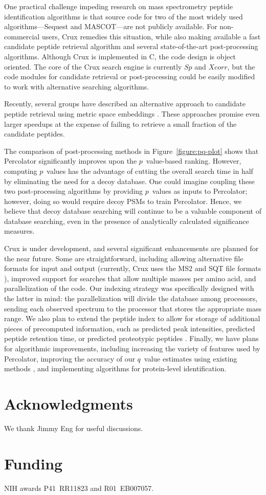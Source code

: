\documentclass[12pt]{article}
\begin{document}
One practical challenge impeding research on mass spectrometry peptide
identification algorithms is that source code for two of the most
widely used algorithms---{\sc Sequest} and MASCOT---are not publicly
available.  For non-commercial users, Crux remedies this situation,
while also making available a fast candidate peptide retrieval
algorithm and several state-of-the-art post-processing algorithms.
Although Crux is implemented in C, the code design is object oriented.
The core of the Crux search engine is currently $Sp$
and $Xcorr$, but the code modules for candidate retrieval or
post-processing could be easily modified to work with alternative
searching algorithms.

Recently, several groups have described an alternative
approach to candidate peptide retrieval using metric space embeddings
\cite{ramakrishnan:fast, dutta:speeding}.  These approaches promise
even larger speedups at the expense of failing to retrieve a small
fraction of the candidate peptides.

The comparison of post-processing methods in
Figure~\ref{figure:pq-plot} shows that Percolator significantly
improves upon the $p$~value-based ranking.  However, computing
$p$~values has the advantage of cutting the overall search time in
half by eliminating the need for a decoy database.  One could imagine
coupling these two post-processing algorithms by providing $p$~values
as inputs to Percolator; however, doing so would require decoy PSMs to
train Percolator.  Hence, we believe that decoy database searching
will continue to be a valuable component of database searching, even
in the presence of analytically calculated significance measures.

Crux is under development, and several significant enhancements are
planned for the near future.  Some are straightforward, including
allowing alternative file formats for input and output (currently,
Crux uses the MS2 and SQT file formats \cite{mcdonald:ms1}), improved
support for searches that allow multiple masses per amino acid, and
parallelization of the code. Our indexing strategy was specifically
designed with the latter in mind: the parallelization will divide the
database among processors, sending each observed spectrum to the
processor that stores the appropriate mass range.  We also plan to
extend the peptide index to allow for storage of additional pieces of
precomputed information, such as predicted peak intensities,
predicted peptide retention time, or predicted proteotypic peptides
\cite{mallick:computational}.  Finally, we have plans for algorithmic
improvements, including increasing the variety of features used by
Percolator, improving the accuracy of our $q$~value estimates using
existing methods \cite{storey:direct}, and implementing algorithms for
protein-level identification.

\section*{Acknowledgments}
We thank Jimmy Eng for useful discussions.

\section*{Funding}
NIH awards P41~RR11823 and R01~EB007057.


 
\end{document}
